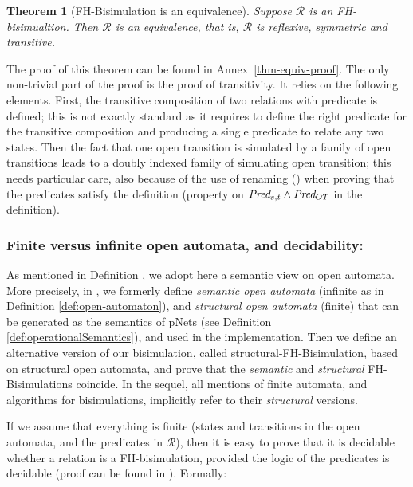 \documentclass{lmcs}
\newcommand{\TODO}[1]{\textcolor{red}{\textbf{[TODO:#1]}}}
\newtheorem{theorem}{Theorem}
\begin{document}
\begin{theorem}[FH-Bisimulation is an equivalence]\label{thm-equiv} Suppose $\mathcal{R}$ 
is an FH-bisimualtion. Then $\mathcal{R}$ is an equivalence, that is, $\mathcal{R}$ is 
reflexive, symmetric and transitive.
\end{theorem}

The proof of this theorem can be found in Annex~\ref{thm-equiv-proof}. The
only non-trivial part of the proof is the proof of transitivity. It
relies on the following elements. First,  the transitive composition
of two relations with predicate is defined; this is not exactly
standard as it requires to define the right predicate for the
transitive composition and producing a single predicate to relate any
two states. Then the fact that one open transition is simulated by a
family of open transitions leads to a doubly indexed family of
simulating open transition; this needs particular care, also because
of the use of renaming (\Post) when proving that the predicates
satisfy the definition (property on $\Pred_{s,t} \land \Pred_{OT}$ in
the definition).  


\medskip



\subsubsection*{Finite versus infinite open automata, and decidability:} 
As mentioned in Definition \pageref{def:open-automaton}, we adopt here a semantic view on open automata. More precisely, in \cite{hou:hal-02406098}, we formerly define
\emph{semantic open automata} (infinite as in Definition \ref{def:open-automaton}),
and \emph{structural open automata} (finite) that can be generated as
the semantics of pNets (see Definition \ref{def:operationalSemantics}), and used in the implementation. Then we define
an alternative version of our bisimulation, called
structural-FH-Bisimulation, based on structural open automata, and
prove that the \emph{semantic} and \emph{structural} FH-Bisimulations coincide.
In the sequel, all mentions of finite automata, and algorithms for
bisimulations, implicitly refer to their \emph{structural} versions.

If we assume that everything is finite (states and transitions in the
open automata, and the predicates in $\mathcal{R}$), then it is easy to
prove that it is decidable whether a relation is a 
FH-bisimulation, provided the logic of the predicates is
decidable (proof can be found in \cite{henrio:Forte2016}). Formally:
\end{document}
